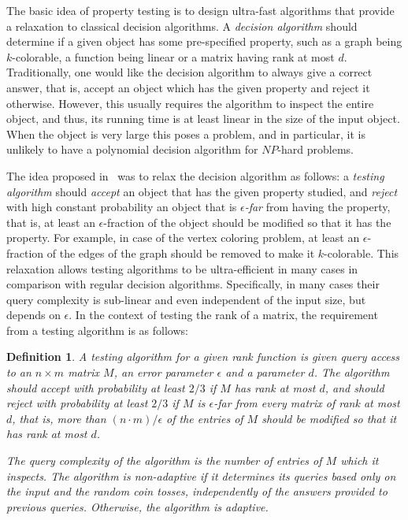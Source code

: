 \documentclass[11pt]{article}
\newtheorem{definition}[theorem]{Definition}
\begin{document}
{{The basic idea of property testing is to design ultra-fast algorithms that provide a relaxation to classical decision algorithms.
A {\em decision algorithm} should determine if a given object has some pre-specified property, such as a graph being $k$-colorable, a function being linear or a matrix having rank at most $d$.
Traditionally, one would like the decision algorithm to always give a correct answer, that is, accept an object which has the given property and reject it otherwise.
However, this usually requires the algorithm to inspect the entire object, and thus, its running time is at least linear in the size of the input object.
When the object is very large this poses a problem, and in particular, it is unlikely to have a polynomial decision algorithm for $NP$-hard problems.

The idea proposed in~\cite{rubinfeld1996robust,GGR98} was to relax the decision algorithm as follows:
a {\em testing algorithm} should {\em accept} an object that has the given property studied, and {\em reject} with high constant probability an object that is {\em $\epsilon$-far}
from having the property, that is, at least an $\epsilon$-fraction of the object should be modified so that it has the property.
For example, in case of the vertex coloring problem, at least an $\epsilon$-fraction of the edges of the graph should be removed to make it $k$-colorable.
This relaxation allows testing algorithms to be ultra-efficient in many cases in comparison with regular decision algorithms.
Specifically, in many cases their query complexity is sub-linear and even independent of the input size, but depends on $\epsilon$.
In the context of testing the rank of a matrix, the requirement from a testing algorithm is as follows:

\begin{definition}
A {\em testing algorithm} for a given rank function is given query access to an $n \times m$ matrix $M$, an error parameter $\epsilon$ and a parameter $d$.
The algorithm  should accept with probability at least $2/3$ if $M$ has rank at most $d$, and should reject with probability at least $2/3$ if $M$ is $\epsilon$-far
from every matrix of rank at most $d$, that is, more than $(n \cdot m )/\epsilon$ of the entries of $M$ should be modified so that it has rank at most $d$.

The {\em query complexity} of the algorithm is the number of entries of $M$ which it inspects.
The algorithm is {\em non-adaptive} if it determines its queries based only on the input and the random coin tosses, independently of the answers provided to previous queries.
Otherwise, the algorithm is {\em adaptive}.
\end{definition}

}}
\end{document}
